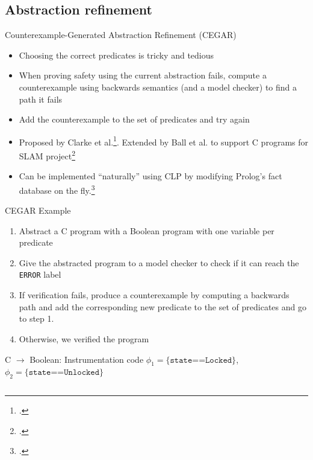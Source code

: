 \documentclass[aspectratio=169]{beamer}
\begin{document}
\subsection{Abstraction refinement}
\begin{frame}{Counterexample-Generated Abstraction Refinement (CEGAR)}
  \begin{itemize}[<+->]
  \item Choosing the correct predicates is tricky and tedious
  \item When proving safety using the current abstraction fails, compute a counterexample using backwards semantics (and a model checker) to find a path it fails
  \item Add the counterexample to the set of predicates and try again
  \item Proposed by Clarke et al.\footcite{clarke2003counterexample}. Extended by Ball et al. to support C programs for SLAM project\footcite{ball2001automatic,ball2001automatically}
  \item Can be implemented ``naturally'' using CLP by modifying Prolog's fact database on the fly.\footcite{podelski2007armc}
  \end{itemize}
\end{frame}

\begin{frame}{CEGAR Example}
  \footnotesize
  \begin{enumerate}[<+->]
  \item Abstract a C program with a Boolean program with one variable per predicate
  \item Give the abstracted program to a model checker to check if it can reach the \texttt{ERROR} label
  \item If verification fails, produce a counterexample by computing a backwards path and add the corresponding new predicate to the set of predicates and go to step 1.
  \item Otherwise, we verified the program
  \end{enumerate}
\end{frame}

\begin{frame}{C $\to$ Boolean: Instrumentation code}
  \small
  $\phi_1 = \texttt{\{state==Locked\}}$, $\phi_2 = \texttt{\{state==Unlocked\}}$\\
  \begin{columns}[t]
    \begin{column}{0.45\textwidth}
      
    \end{column}
    \begin{column}{0.45\textwidth}
      
    \end{column}
  \end{columns}
\end{frame}
\end{document}
